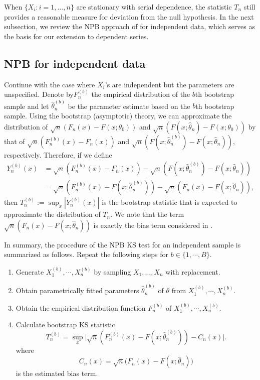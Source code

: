 \documentclass[12pt]{article}
\begin{document}
When $\{X_i: i = 1, \ldots, n\}$ are stationary with serial
dependence, the statistic
$T_n$ still provides a reasonable measure for deviation from the null
hypothesis. In the next subsection, we review the NPB approach of
\citet{babu2004goodness} for independent data, which serves as the
basis for our extension to dependent series.


\subsection{NPB for independent data}

Continue with the case where $X_i$'s are independent but the parameters
are unspecified. Denote by$F^{(b)}_n$ the empirical distribution of the $b$th bootstrap sample and let
$\hat\theta^{(b)}_n$ be the parameter estimate based on the $b$th bootstrap
sample.
Using the bootstrap (asymptotic) theory, we can approximate the distribution of
$\sqrt{n}(F_n(x) - F(x; \theta_0))$ and
$\sqrt{n}(F(x; \hat\theta_n) - F(x; \theta_0))$
by that of $\sqrt{n}(F^{(b)}_n(x) - F_n(x))$ and
$\sqrt{n}(F(x; \hat\theta^{(b)}_n) - F(x; \hat\theta_n))$, respectively.
Therefore, if we define
\begin{align*}
Y^{(b)}_n(x) &= \sqrt{n}(F^{(b)}_n(x) - F_n(x)) -
               \sqrt{n}(F(x; \hat\theta^{(b)}_n) - F(x; \hat\theta_n)) \\
             &= \sqrt{n}(F^{(b)}_n(x) - F(x; \hat\theta^{(b)}_n)) -
               \sqrt{n}(F_n(x) - F(x; \hat\theta_n)),
\end{align*}
then $T^{(b)}_n := \sup_x|Y^{(b)}_n(x)|$ is the bootstrap statistic that is
expected to approximate the distribution of $T_n$.
We note that the term
$\sqrt{n}(F_n(x) - F(x; \hat\theta_n))$ is exactly the bias term considered in
\citet{babu2004goodness}.


In summary, the procedure of the NPB KS test for an independent sample is
summarized as follows. Repeat the following steps for $b \in \{1,  \cdots , B\}$.
\begin{enumerate}
\item
  Generate $X^{(b)}_1, \cdots ,X^{(b)}_n$ by sampling $X_1, \ldots, X_n$
  with replacement.
\item
  Obtain parametrically
  fitted parameters
	$\hat\theta^{(b)}_n$ of $\theta$ from $X^{(b)}_1, \cdots ,X^{(b)}_n$.
\item
  Obtain the empirical distribution function $F^{(b)}_n$ of
  $X^{(b)}_1, \cdots ,X^{(b)}_n$.
\item
  Calculate bootstrap KS statistic
  \[
    T^{(b)}_n = \sup_x \Big\vert \sqrt{n}\left(F^{(b)}_n(x)
    - F(x; \hat\theta^{(b)}_n)\right) - C_n(x) \Big\vert.
  \]
  where
  \[
    C_{n}(x) = \sqrt{n}\bigl(F_n(x) - F(x; \hat\theta_n)\bigr)
  \]
  is the estimated bias term.
\end{enumerate}
\end{document}
